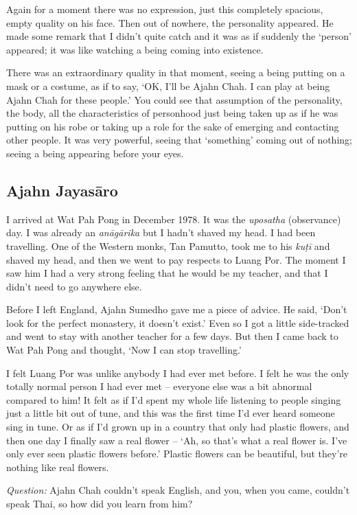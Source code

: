 Again for a moment there was no expression, just this completely
spacious, empty quality on his face. Then out of nowhere, the
personality appeared. He made some remark that I didn't quite catch and
it was as if suddenly the `person' appeared; it was like watching a
being coming into existence.

There was an extraordinary quality in that
moment, seeing a being putting on a mask or a costume, as if to say, 
`OK, I'll be Ajahn Chah. I can play at being Ajahn Chah for these
people.' You could see that assumption of the personality, the body, all
the characteristics of personhood just being taken up as if he was
putting on his robe or taking up a role for the sake of emerging and
contacting other people. It was very powerful, seeing that `something'
coming out of nothing; seeing a being appearing before your eyes. 

\subsection{Ajahn Jayasāro}

I arrived at Wat Pah Pong in December 1978. It was the \emph{uposatha}
 (observance) day. I was already an \emph{anāgārika} but I hadn't shaved
my head. I had been travelling. One of the Western monks, Tan Pamutto, 
took me to his \emph{kuṭī} and shaved my head, and then we went to pay
respects to Luang Por. The moment I saw him I had a very strong feeling
that he would be my teacher, and that I didn't need to go anywhere else. 

Before I left England, Ajahn Sumedho gave me a piece of advice. He said, 
`Don't look for the perfect monastery, it doesn't exist.' Even so I got
a little side-tracked and went to stay with another teacher for a few
days. But then I came back to Wat Pah Pong and thought, `Now I can stop
travelling.'

I felt Luang Por was unlike anybody I had ever met before. I felt he was
the only totally normal person I had ever met -- everyone else was a bit
abnormal compared to him! It felt as if I'd spent my whole life
listening to people singing just a little bit out of tune, and this was
the first time I'd ever heard someone sing in tune. Or as if I'd grown
up in a country that only had plastic flowers, and then one day I
finally saw a real flower -- `Ah, so that's what a real flower is. I've
only ever seen plastic flowers before.' Plastic flowers can be
beautiful, but they're nothing like real flowers.

\emph{Question:} Ajahn Chah couldn't speak English, and you, when you
came, couldn't speak Thai, so how did you learn from him?

